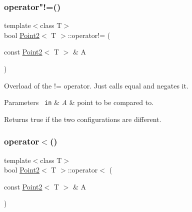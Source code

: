 \mbox{\label{class_point2_ad671e757853f5d7d5431d011d9e94b03}} 
\subsubsection{\texorpdfstring{operator"!=()}{operator!=()}}
{\footnotesize\ttfamily template$<$class T$>$ \\
bool \mbox{\hyperlink{class_point2}{Point2}}$<$ T $>$\+::operator!= (\begin{DoxyParamCaption}\item[{const \mbox{\hyperlink{class_point2}{Point2}}$<$ T $>$ \&}]{A }\end{DoxyParamCaption})\hspace{0.3cm}{\ttfamily [inline]}}



Overload of the != operator. Just calls {\ttfamily equal} and negates it. 


\begin{DoxyParams}[1]{Parameters}
\mbox{\texttt{ in}}  & {\em A} & point to be compared to. \\
\hline
\end{DoxyParams}
\begin{DoxyReturn}{Returns}
true if the two configurations are different. 
\end{DoxyReturn}
\mbox{\label{class_point2_a636a84c47519a482cfce43039e981dff}} 
\subsubsection{\texorpdfstring{operator$<$()}{operator<()}}
{\footnotesize\ttfamily template$<$class T$>$ \\
bool \mbox{\hyperlink{class_point2}{Point2}}$<$ T $>$\+::operator$<$ (\begin{DoxyParamCaption}\item[{const \mbox{\hyperlink{class_point2}{Point2}}$<$ T $>$ \&}]{A }\end{DoxyParamCaption})\hspace{0.3cm}{\ttfamily [inline]}}

\mbox{\label{class_point2_af715722f2b04def60eb23f291e31c4d8}} 
